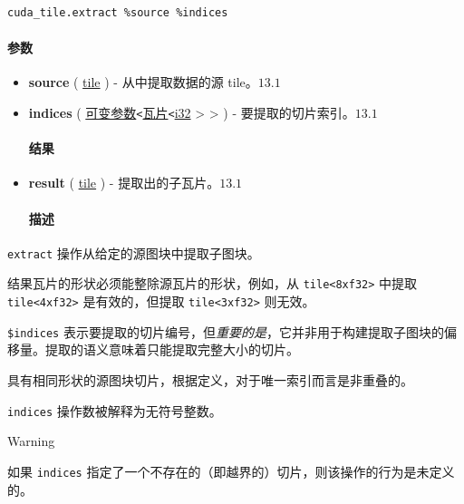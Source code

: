 \documentclass{article}
\begin{document}
\begin{lstlisting}
cuda_tile.extract %source %indices
\end{lstlisting}

\paragraph{参数}

\begin{itemize}
\item \textbf{source} ( \href{https://docs.nvidia.com/cuda/tile-ir/latest/sections/types.html#type-tile}{tile} ) - 从中提取数据的源 tile。$\boxed{13.1}$
\item \textbf{indices} ( \href{https://docs.nvidia.com/cuda/tile-ir/latest/sections/operations.html#type-variadic}{可变参数}\texttt{<}\href{https://docs.nvidia.com/cuda/tile-ir/latest/sections/types.html#type-tile}{瓦片}\texttt{<}\href{https://docs.nvidia.com/cuda/tile-ir/latest/sections/types.html#subsection-element-types}{i32} > > ) - 要提取的切片索引。$\boxed{13.1}$


\paragraph{结果}

\item \textbf{result} ( \href{https://docs.nvidia.com/cuda/tile-ir/latest/sections/types.html#type-tile}{tile} ) - 提取出的子瓦片。$\boxed{13.1}$


\paragraph{描述}

\end{itemize}
\texttt{extract} 操作从给定的源图块中提取子图块。


结果瓦片的形状必须能整除源瓦片的形状，例如，从 \texttt{tile<8xf32>} 中提取 \texttt{tile<4xf32>} 是有效的，但提取 \texttt{tile<3xf32>} 则无效。


\texttt{\$indices} 表示要提取的切片编号，但\textit{重要的是}，它并非用于构建提取子图块的偏移量。提取的语义意味着只能提取完整大小的切片。


具有相同形状的源图块切片，根据定义，对于唯一索引而言是非重叠的。


\texttt{indices} 操作数被解释为无符号整数。


Warning


如果 \texttt{indices} 指定了一个不存在的（即越界的）切片，则该操作的行为是未定义的。
\end{document}
